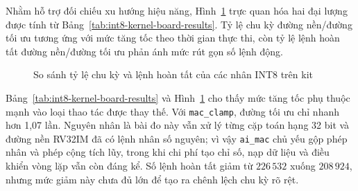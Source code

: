\documentclass[../DoAn.tex]{subfiles}
\begin{document}
\begin{table}[H]
    \centering
    \footnotesize
    \setlength{\tabcolsep}{4pt}
    \renewcommand{\arraystretch}{1.12}
    \caption{Kết quả đo các nhân INT8 trên kit DE2i-150/CV32E40P}
    \label{tab:int8-kernel-board-results}
\end{table}

Nhằm hỗ trợ đối chiếu xu hướng hiệu năng, Hình~\ref{fig:int8-kernel-board-speedup} trực quan hóa hai đại lượng được tính từ Bảng~\ref{tab:int8-kernel-board-results}. Tỷ lệ chu kỳ đường nền/đường tối ưu tương ứng với mức tăng tốc theo thời gian thực thi, còn tỷ lệ lệnh hoàn tất đường nền/đường tối ưu phản ánh mức rút gọn số lệnh động.

\begin{figure}[H]
    \centering
    \resizebox{0.88\linewidth}{!}{}
    \caption{So sánh tỷ lệ chu kỳ và lệnh hoàn tất của các nhân INT8 trên kit}
    \label{fig:int8-kernel-board-speedup}
\end{figure}

Bảng~\ref{tab:int8-kernel-board-results} và Hình~\ref{fig:int8-kernel-board-speedup} cho thấy mức tăng tốc phụ thuộc mạnh vào loại thao tác được thay thế. Với \texttt{mac\_clamp}, đường tối ưu chỉ nhanh hơn 1,07 lần. Nguyên nhân là bài đo này vẫn xử lý từng cặp toán hạng 32 bit và đường nền RV32IM đã có lệnh nhân số nguyên; vì vậy \texttt{ai\_mac} chủ yếu gộp phép nhân và phép cộng tích lũy, trong khi chi phí tạo chỉ số, nạp dữ liệu và điều khiển vòng lặp vẫn còn đáng kể. Số lệnh hoàn tất giảm từ \(226\,532\) xuống \(208\,924\), nhưng mức giảm này chưa đủ lớn để tạo ra chênh lệch chu kỳ rõ rệt.
\end{document}
